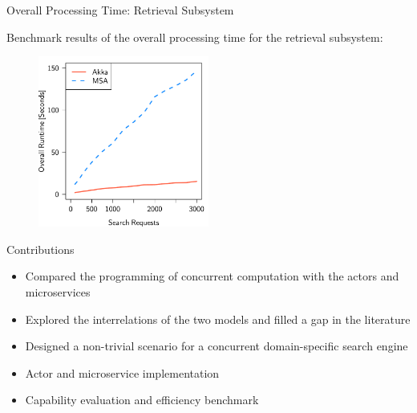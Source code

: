 \documentclass{beamer}
\begin{document}

\begin{frame}{Overall Processing Time: Retrieval Subsystem}

Benchmark results of the overall processing time for the retrieval subsystem:

\begin{center}
  \begin{figure} 
    \includegraphics[width=0.5\textwidth]{graphics/eval-search-rtt-overall.pdf} 
  \end{figure}
\end{center}

\end{frame}


\begin{frame}{Contributions}

\begin{itemize}
  \item Compared the programming of concurrent computation with the actors and microservices
  \item Explored the interrelations of the two models and filled a gap in the literature
  \item Designed a non-trivial scenario for a concurrent domain-specific search engine
  \item Actor and microservice implementation
  \item Capability evaluation and efficiency benchmark
\end{itemize}

\end{frame}

\end{document}
